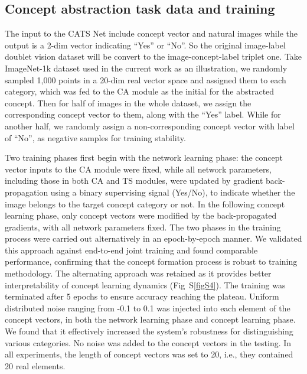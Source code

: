 \documentclass[pdflatex,sn-mathphys-num,lineno]{sn-jnl}%
\begin{document}
\begin{CJK}{UTF8}{gbsn}
\subsection{Concept abstraction task data and training}

The input to the CATS Net include concept vector and natural images while the output is a 2-dim vector indicating “Yes” or “No”. So the original image-label doublet vision dataset will be convert to the image-concept-label triplet one. Take ImageNet-1k dataset used in the current work as an illustration, we randomly sampled 1,000 points in a 20-dim real vector space and assigned them to each category, which was fed to the CA module as the initial for the abstracted concept. Then for half of images in the whole dataset, we assign the corresponding concept vector to them, along with the “Yes” label. While for another half, we randomly assign a non-corresponding concept vector with label of “No”, as negative samples for training stability. 

Two training phases first begin with the network learning phase: the concept vector inputs to the CA module were fixed, while all network parameters, including those in both CA and TS modules, were updated by gradient back-propagation using a binary supervising signal (Yes/No), to indicate whether the image belongs to the target concept category or not. In the following concept learning phase, only concept vectors were modified by the back-propagated gradients, with all network parameters fixed. The two phases in the training process were carried out alternatively in an epoch-by-epoch manner. We validated this approach against end-to-end joint training and found comparable performance, confirming that the concept formation process is robust to training methodology. The alternating approach was retained as it provides better interpretability of concept learning dynamics (Fig~S\ref{figS4}). The training was terminated after 5 epochs to ensure accuracy reaching the plateau. Uniform distributed noise ranging from -0.1 to 0.1 was injected into each element of the concept vectors, in both the network learning phase and concept learning phase. We found that it effectively increased the system’s robustness for distinguishing various categories. No noise was added to the concept vectors in the testing. In all experiments, the length of concept vectors was set to 20, i.e., they contained 20 real elements.


\end{CJK}
\end{document}
